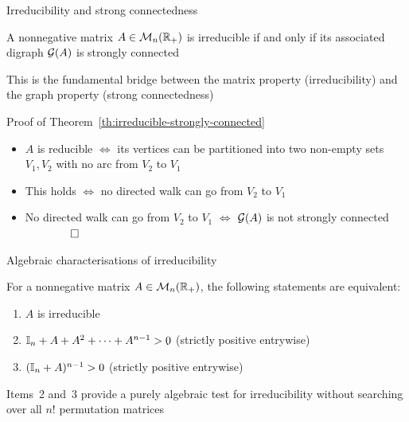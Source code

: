 \documentclass[aspectratio=169]{beamer}\usepackage[]{graphicx}\usepackage[]{xcolor}
\begin{document}
\begin{frame}{Irreducibility and strong connectedness}
\begin{importanttheorem}
\label{th:irreducible-strongly-connected}
A nonnegative matrix $A \in \mathcal{M}_n(\mathbb{R}_+)$ is irreducible if and only if its associated digraph $\mathcal{G}(A)$ is strongly connected
\end{importanttheorem}
\vfill
This is the fundamental bridge between the matrix property (irreducibility) and the graph property (strong connectedness)
\end{frame}

\begin{frame}{Proof of Theorem~\ref{th:irreducible-strongly-connected}}
\begin{itemize}
\item $A$ is reducible $\iff$ its vertices can be partitioned into two non-empty sets $V_1, V_2$ with no arc from $V_2$ to $V_1$
\vfill
\item This holds $\iff$ no directed walk can go from $V_2$ to $V_1$
\vfill
\item No directed walk can go from $V_2$ to $V_1$ $\iff$ $\mathcal{G}(A)$ is not strongly connected $\qquad \qed$
\end{itemize}
\end{frame}

\begin{frame}{Algebraic characterisations of irreducibility}
\begin{theorem}
\label{th:irreducible-algebraic}
For a nonnegative matrix $A \in \mathcal{M}_n(\mathbb{R}_+)$, the following statements are equivalent:
\begin{enumerate}
\item $A$ is irreducible
\item $\mathbb{I}_n + A + A^2 + \cdots + A^{n-1} > 0$ (strictly positive entrywise)
\item $(\mathbb{I}_n + A)^{n-1} > 0$ (strictly positive entrywise)
\end{enumerate}
\end{theorem}
\vfill
Items~2 and~3 provide a purely algebraic test for irreducibility without searching over all $n!$ permutation matrices
\end{frame}
\end{document}
